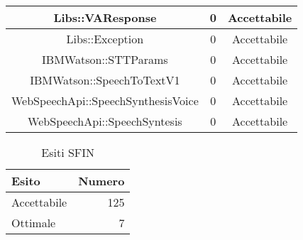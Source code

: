 \begin{longtable}{|c|c|c|}
\hline Libs::VAResponse & 0 & Accettabile \\
\hline Libs::Exception & 0 & Accettabile \\
\hline IBMWatson::STTParams & 0 & Accettabile \\
\hline IBMWatson::SpeechToTextV1 & 0 & Accettabile \\
\hline WebSpeechApi::SpeechSynthesisVoice & 0 & Accettabile \\
\hline WebSpeechApi::SpeechSyntesis & 0 & Accettabile \\
\hline \end{longtable}\begin{table}[h]
	\centering
	\begin{tabular}{l r}
		\hline
		\rule[-0.3cm]{0cm}{0.8cm}
		\textbf{Esito} & \textbf{Numero} \\
		\hline
		\rule[0cm]{0cm}{0.4cm}
		Accettabile & 125 \\
		\rule[0cm]{0cm}{0.4cm}
		Ottimale & 7 \\
		\hline
  \end{tabular}
	\caption{Esiti SFIN}
\end{table}